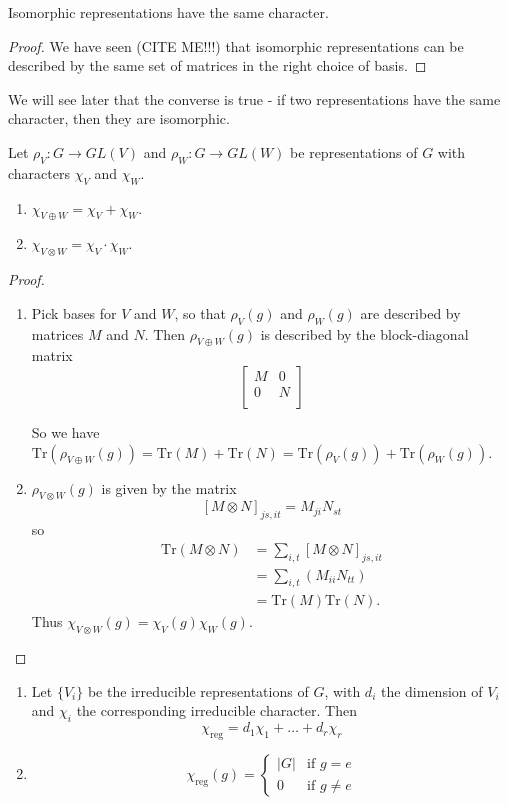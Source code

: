 \begin{prop}\label{iso-reprns-same-char}
Isomorphic representations have the same character.
\end{prop}
\begin{proof}
We have seen (CITE ME!!!) that isomorphic representations can be described by the same set of matrices in the right choice of basis.
\end{proof}
We will see later that the converse is true - if two representations have the same character, then they are isomorphic.

\begin{prop}
Let $\rho_V \colon G \to GL(V)$ and $\rho_W \colon G \to GL(W)$ be representations of $G$ with characters $\chi_V$ and $\chi_W$.
\begin{enumerate}
\item $\chi _{V \oplus W} = \chi_V + \chi_W$.
\item $\chi_{V \otimes W} = \chi_V \cdot \chi_W$.
\end{enumerate}
\end{prop}
\begin{proof}
\begin{enumerate}
\item Pick bases for $V$ and $W$, so that $\rho_V (g)$ and $\rho_W (g)$ are described by matrices $M$ and $N$.  Then $\rho_{V \oplus W} (g)$ is described by the block-diagonal matrix
\[ \begin{bmatrix}
M & 0 \\
0 & N \\
\end{bmatrix} \]

So we have $\text{Tr} (\rho_{V \oplus W} (g)) = \text{Tr} (M) + \text{Tr}(N) = \text{Tr}(\rho_V (g)) + \text{Tr} (\rho_W (g))$.
\item $\rho_ {V \otimes W}(g)$ is given by the matrix
\[ [M \otimes N ]_{js, it} = M_{ji} N_{st} \]
so
\begin{align*}
\text{Tr} (M \otimes N) &= \sum_{i,t} [M \otimes N]_{js,it} \\
	&= \sum_{i,t} (M_{ii} N_{tt}) \\
	&= \text{Tr} (M) \text{Tr} (N).
\end{align*}
Thus $\chi_{V \otimes W} (g)= \chi_V (g) \chi_W(g)$.
\end{enumerate}
\end{proof}

\begin{prop}
\begin{enumerate}
\item Let $\{ V_i \}$ be the irreducible representations of $G$, with $d_i$  the dimension of  $V_i$ and $\chi_i$ the corresponding irreducible character.  Then
\[ \chi_{\text{reg}} = d_1 \chi_1 + \ldots + d_r \chi_r \]

\item \[  
\chi_{\text{reg}} (g) = \begin{cases} 
|G| &\text{if } g = e \\ 
0 & \text{if } g \neq e 
\end{cases}  \]
\end{enumerate}
\end{prop}

